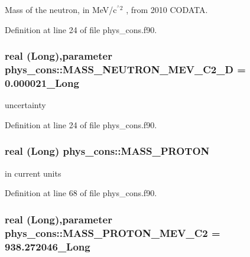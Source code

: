 Mass of the neutron, in MeV/c$^{\mbox{$^\wedge$2}}$ , from 2010 CODATA. 



Definition at line 24 of file phys\_\-cons.f90.

\hypertarget{namespacephys__cons_ab5fb46dc243eb307a344a134a593edd0}{
\subsubsection[{MASS\_\-NEUTRON\_\-MEV\_\-C2\_\-D}]{\setlength{\rightskip}{0pt plus 5cm}real (Long),parameter {\bf phys\_\-cons::MASS\_\-NEUTRON\_\-MEV\_\-C2\_\-D} = 0.000021\_\-Long}}
\label{namespacephys__cons_ab5fb46dc243eb307a344a134a593edd0}


uncertainty 



Definition at line 24 of file phys\_\-cons.f90.

\hypertarget{namespacephys__cons_a20e8ed3d7ff389588ce024048c5ccf85}{
\subsubsection[{MASS\_\-PROTON}]{\setlength{\rightskip}{0pt plus 5cm}real (Long) {\bf phys\_\-cons::MASS\_\-PROTON}}}
\label{namespacephys__cons_a20e8ed3d7ff389588ce024048c5ccf85}


in current units 



Definition at line 68 of file phys\_\-cons.f90.

\hypertarget{namespacephys__cons_a3460d18828c87b266ab35b1cdeb4a0a5}{
\subsubsection[{MASS\_\-PROTON\_\-MEV\_\-C2}]{\setlength{\rightskip}{0pt plus 5cm}real (Long),parameter {\bf phys\_\-cons::MASS\_\-PROTON\_\-MEV\_\-C2} = 938.272046\_\-Long}}
\label{namespacephys__cons_a3460d18828c87b266ab35b1cdeb4a0a5}


